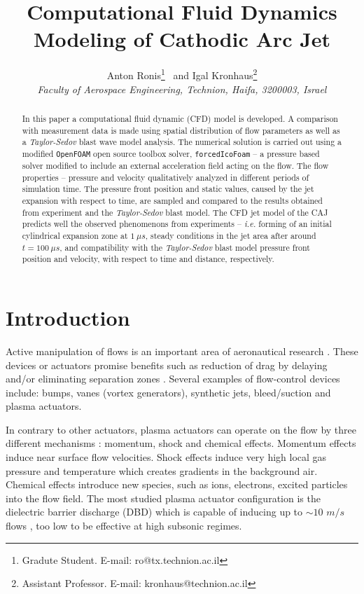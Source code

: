 \documentclass[a4paper]{iacas}%
\title{Computational Fluid Dynamics Modeling of Cathodic Arc Jet}
\author{%
	Anton Ronis\thanks{Gradute Student. E-mail: ro@tx.technion.ac.il}
	\ and
	Igal Kronhaus\thanks{Assistant Professor. E-mail: kronhaus@technion.ac.il}\\
	{\normalsize\itshape
		Faculty of Aerospace Engineering, Technion, Haifa,
		3200003, Israel}
}
\begin{document}
	
	\maketitle
	
	\begin{abstract}
		In this paper a computational fluid dynamic (CFD) model is developed. A comparison with measurement data is made using spatial distribution of flow parameters as well as a \emph{Taylor-Sedov} blast wave model analysis.
		The numerical solution is carried out using a modified \texttt{OpenFOAM}  open source toolbox solver, \texttt{forcedIcoFoam} -- a pressure based solver modified to include an external acceleration field acting on the flow.	
		The flow properties -- pressure and velocity qualitatively analyzed in different periods of simulation time. The pressure front position and static values, caused by the jet expansion with respect to time, are sampled and compared to the results obtained from experiment and the \emph{Taylor-Sedov} blast model.
		The CFD jet model of the CAJ predicts well the observed phenomenons from experiments -- \emph{i.e.} forming of an initial cylindrical expansion zone at $1~\mu s$, steady conditions in the jet area after around $t = 100~\mu s$, and compatibility with the \emph{Taylor-Sedov} blast model pressure front position and velocity, with respect to time and distance, respectively. 
	\end{abstract}

\section{Introduction}
Active manipulation of flows is an important area of aeronautical research \cite{GADEL}. These devices or actuators promise benefits such as reduction of drag by delaying and/or eliminating separation zones \cite{SIMPSON}. Several examples of flow-control devices include: bumps, vanes (vortex generators), synthetic jets, bleed/suction and plasma actuators.

In contrary to other actuators, plasma actuators can operate on the flow by three different mechanisms \cite{FLOWCTRL}: momentum, shock and chemical effects. Momentum effects induce near surface flow velocities. Shock effects induce very high local gas pressure and temperature which creates gradients in the background air. Chemical effects introduce new species, such as ions, electrons, excited particles into the flow field. The most studied plasma actuator configuration is the dielectric barrier discharge (DBD) which is capable of inducing up to $\sim10$ $m/s$ flows \cite{FLOWCTRL,KOK,WHALLEY,MOREAU}, too low to be effective at high subsonic regimes.
\end{document}
